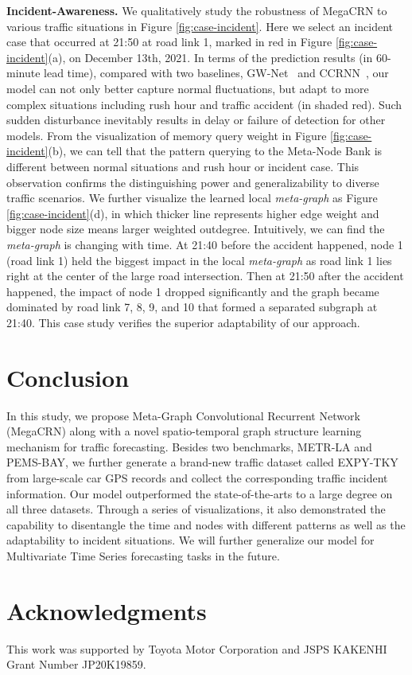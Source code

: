 \documentclass[letterpaper]{article} \usepackage{aaai23}  \usepackage{times}  \usepackage{helvet}  \usepackage{courier}  \usepackage[hyphens]{url}  \usepackage{graphicx} \urlstyle{rm} \def\UrlFont{\rm}  \usepackage{natbib}  \usepackage{caption} \usepackage{multirow}
\begin{document}
\noindent\textbf{Incident-Awareness.} We qualitatively study the robustness of MegaCRN to various traffic situations in Figure \ref{fig:case-incident}. Here we select an incident case that occurred at 21:50 at road link 1, marked in red in Figure \ref{fig:case-incident}(a), on December 13th, 2021. In terms of the prediction results (in 60-minute lead time), compared with two baselines, GW-Net~\cite{wu2019graph} and CCRNN~\cite{ye2021coupled}, our model can not only better capture normal fluctuations, but adapt to more complex situations including rush hour and traffic accident (in shaded red). Such sudden disturbance inevitably results in delay or failure of detection for other models. From the visualization of memory query weight in Figure \ref{fig:case-incident}(b), we can tell that the pattern querying to the Meta-Node Bank is different between normal situations and rush hour or incident case. This observation confirms the distinguishing power and generalizability to diverse traffic scenarios. We further visualize the learned local \textit{meta-graph} as Figure \ref{fig:case-incident}(d), in which thicker line represents higher edge weight and bigger node size means larger weighted outdegree. Intuitively, we can find the \textit{meta-graph} is changing with time. At 21:40 before the accident happened, node 1 (road link 1) held the biggest impact in the local \textit{meta-graph} as road link 1 lies right at the center of the large road intersection. Then at 21:50 after the accident happened, the impact of node 1 dropped significantly and the graph became dominated by road link 7, 8, 9, and 10 that formed a separated subgraph at 21:40. This case study verifies the superior adaptability of our approach. 







\section{Conclusion}\label{sec:conclusion}
In this study, we propose Meta-Graph Convolutional Recurrent Network (MegaCRN) along with a novel spatio-temporal graph structure learning mechanism for traffic forecasting. Besides two benchmarks, METR-LA and PEMS-BAY, we further generate a brand-new traffic dataset called EXPY-TKY from large-scale car GPS records and collect the corresponding traffic incident information. Our model outperformed the state-of-the-arts to a large degree on all three datasets. Through a series of visualizations, it also demonstrated the capability to disentangle the time and nodes with different patterns as well as the adaptability to incident situations. We will further generalize our model for Multivariate Time Series forecasting tasks in the future.



\section{Acknowledgments}
This work was supported by Toyota Motor Corporation and JSPS KAKENHI Grant Number JP20K19859.


\end{document}
